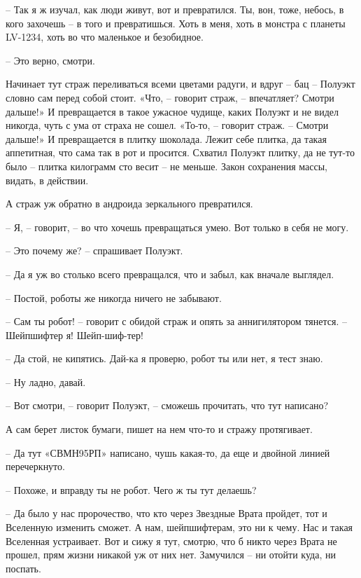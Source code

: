 \documentclass[ebook,oneside,final,openright]{memoir}
\begin{document}
– Так я ж изучал, как люди живут, вот и превратился. Ты, вон, тоже, небось, в кого захочешь – в того и превратишься. Хоть в меня, хоть в монстра с планеты LV-1234, хоть во что маленькое и безобидное. \par
– Это верно, смотри. \par
\par
Начинает тут страж переливаться всеми цветами радуги, и вдруг – бац – Полуэкт словно сам перед собой стоит. «Что, – говорит страж, – впечатляет? Смотри дальше!» И превращается в такое ужасное чудище, каких Полуэкт и не видел никогда, чуть с ума от страха не сошел. «То-то, – говорит страж. – Смотри дальше!» И превращается в плитку шоколада. Лежит себе плитка, да такая аппетитная, что сама так в рот и просится. Схватил Полуэкт плитку, да не тут-то было – плитка килограмм сто весит – не меньше. Закон сохранения массы, видать, в действии. \par
\par
А страж уж обратно в андроида зеркального превратился. \par
– Я, – говорит, – во что хочешь превращаться умею. Вот только в себя не могу. \par
– Это почему же? – спрашивает Полуэкт.\par
– Да я уж во столько всего превращался, что и забыл, как вначале выглядел. \par
– Постой, роботы же никогда ничего не забывают. \par
– Сам ты робот! – говорит с обидой страж и опять за аннигилятором тянется. – Шейпшифтер я! Шейп-шиф-тер! \par
– Да стой, не кипятись. Дай-ка я проверю, робот ты или нет, я тест знаю. \par
– Ну ладно, давай. \par
– Вот смотри, – говорит Полуэкт, – сможешь прочитать, что тут написано? \par
А сам берет листок бумаги, пишет на нем что-то и стражу протягивает. \par
– Да тут «СВМН95РП» написано, чушь какая-то, да еще и двойной линией перечеркнуто.\par
– Похоже, и вправду ты не робот. Чего ж ты тут делаешь? \par
– Да было у нас пророчество, что кто через Звездные Врата пройдет, тот и Вселенную изменить сможет. А нам, шейпшифтерам, это ни к чему. Нас и такая Вселенная устраивает. Вот и сижу я тут, смотрю, что б никто через Врата не прошел, прям жизни никакой уж от них нет. Замучился – ни отойти куда, ни поспать. \par
\end{document}
